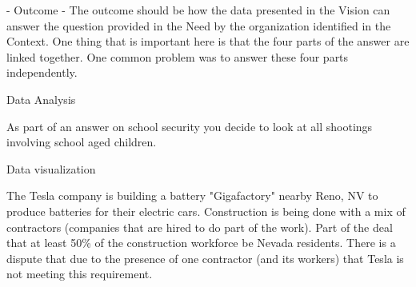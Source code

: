 \documentclass[12pt, letter, addpoints]{exam}
\begin{document}
\begin{questions}
\begin{solution}[3in]
-  Outcome - The outcome should be how the data presented in the Vision can answer the question provided in the Need by the organization identified in the Context.  One thing that is important here is that the four parts of the answer are linked together.  One common problem was to answer these four parts independently.
\end{solution}
\pagebreak
\question[35] Data Analysis

As part of an answer on school security you decide to look at all shootings involving school aged children.

\pagebreak

\begin{center}
\gradetable[v][questions]
\end{center}
\question[30] Data visualization

The Tesla company is building a battery "Gigafactory" nearby Reno, NV to produce batteries for their electric cars. Construction is being done with a mix of contractors (companies that are hired to do part of the work). Part of the deal that at least 50\% of the construction workforce be Nevada residents. There is a dispute that due to the presence of one contractor (and its workers) that Tesla is not meeting this requirement.


\end{questions}
\end{document}
